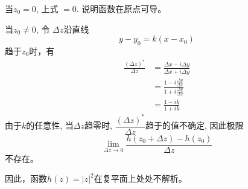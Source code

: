   \begin{inparaenum}[(i)]
    \item 当$z_0=0$, 上式 $= 0$. 说明函数在原点可导。\\
    \item 当$z_0\ne 0$, 令 $\Delta z $沿直线 
    \[ y-y_0 = k(x-x_0)\]
    趋于$z_0$时，有
    \[ \begin{aligned}
      \frac{(\Delta z)^*}{\Delta z} &= \frac{\Delta x- i\Delta y }{\Delta x+ i\Delta y }  \\
      &= \frac{1- i \frac{\Delta y}{\Delta x} }{1+ i \frac{\Delta y}{\Delta x}} \\
      &=   \frac{1- ik }{1+ i k} 
    \end{aligned}\]
    由于$k$的任意性, 当$\Delta z$趋零时, $\dfrac{(\Delta z)^*}{\Delta z} $趋于的值不确定, 因此极限 $$\lim_{\Delta z \to 0 }  \dfrac{h(z_0 +  \Delta z) - h(z_0)}{\Delta z} $$ 不存在。
\end{inparaenum}
因此，函数$h(z) =\left\vert z\right\vert^2 $在复平面上处处不解析。

